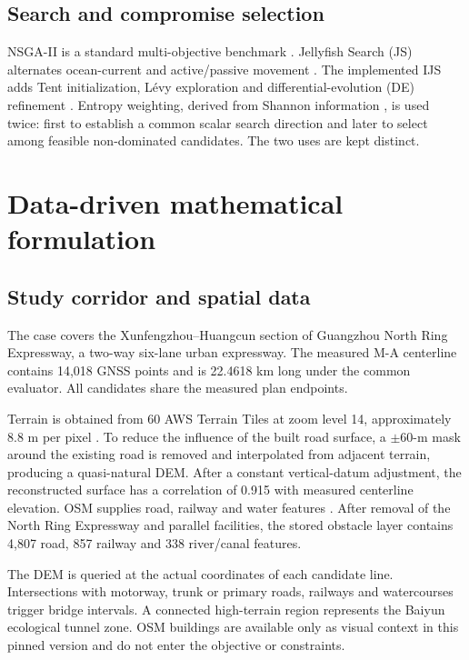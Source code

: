 \documentclass[preprint,12pt]{elsarticle}
\begin{document}
\subsection{Search and compromise selection}

NSGA-II is a standard multi-objective benchmark \cite{deb2002}. Jellyfish Search (JS) alternates ocean-current and active/passive movement \cite{chou2021}. The implemented IJS adds Tent initialization, L\'evy exploration and differential-evolution (DE) refinement \cite{storn1997}. Entropy weighting, derived from Shannon information \cite{shannon1948}, is used twice: first to establish a common scalar search direction and later to select among feasible non-dominated candidates. The two uses are kept distinct.

\section{Data-driven mathematical formulation}\label{sec:model}

\subsection{Study corridor and spatial data}

The case covers the Xunfengzhou--Huangcun section of Guangzhou North Ring Expressway, a two-way six-lane urban expressway. The measured M-A centerline contains 14,018 GNSS points and is 22.4618 km long under the common evaluator. All candidates share the measured plan endpoints.

Terrain is obtained from 60 AWS Terrain Tiles at zoom level 14, approximately 8.8 m per pixel \cite{awsterrain}. To reduce the influence of the built road surface, a $\pm60$-m mask around the existing road is removed and interpolated from adjacent terrain, producing a quasi-natural DEM. After a constant vertical-datum adjustment, the reconstructed surface has a correlation of 0.915 with measured centerline elevation. OSM supplies road, railway and water features \cite{haklay2008,osmlicense}. After removal of the North Ring Expressway and parallel facilities, the stored obstacle layer contains 4,807 road, 857 railway and 338 river/canal features.

The DEM is queried at the actual coordinates of each candidate line. Intersections with motorway, trunk or primary roads, railways and watercourses trigger bridge intervals. A connected high-terrain region represents the Baiyun ecological tunnel zone. OSM buildings are available only as visual context in this pinned version and do not enter the objective or constraints.
\end{document}
